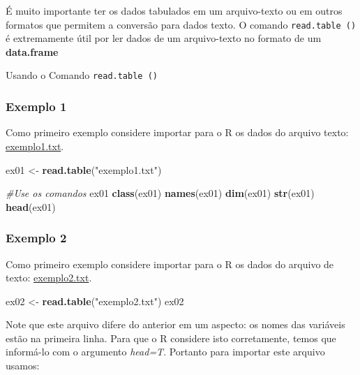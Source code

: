 \documentclass[
]{book}
\newenvironment{Shaded}{\begin{snugshade}}{\end{snugshade}}
\newcommand{\CommentTok}[1]{\textcolor[rgb]{0.56,0.35,0.01}{\textit{#1}}}
\newcommand{\KeywordTok}[1]{\textcolor[rgb]{0.13,0.29,0.53}{\textbf{#1}}}
\newcommand{\NormalTok}[1]{#1}
\newcommand{\StringTok}[1]{\textcolor[rgb]{0.31,0.60,0.02}{#1}}
\begin{document}
É muito importante ter os dados tabulados em um arquivo-texto ou em outros formatos que permitem a conversão para dados texto. O comando \texttt{read.table\ ()} é extremamente útil por ler dados de um arquivo-texto no formato de um \textbf{data.frame}

Usando o Comando \texttt{read.table\ ()}

\hypertarget{exemplo-1-1}{%
\subsubsection{Exemplo 1}\label{exemplo-1-1}}

Como primeiro exemplo considere importar para o R os dados do arquivo texto: \href{https://www.dropbox.com/s/m7jivbbggei5y0x/exemplo1.txt?dl=1}{exemplo1.txt}.

\begin{Shaded}
\begin{Highlighting}[]
\NormalTok{ex01 <-}\StringTok{ }\KeywordTok{read.table}\NormalTok{(}\StringTok{"exemplo1.txt"}\NormalTok{) }

\CommentTok{#Use os comandos}
\NormalTok{  ex01}
  \KeywordTok{class}\NormalTok{(ex01)}
  \KeywordTok{names}\NormalTok{(ex01)}
  \KeywordTok{dim}\NormalTok{(ex01)}
  \KeywordTok{str}\NormalTok{(ex01)}
  \KeywordTok{head}\NormalTok{(ex01)}
\end{Highlighting}
\end{Shaded}

\hypertarget{exemplo-2-1}{%
\subsubsection{Exemplo 2}\label{exemplo-2-1}}

Como primeiro exemplo considere importar para o R os dados do arquivo de texto: \href{https://www.dropbox.com/s/bi4b0j2nnnetc1r/exemplo2.txt?dl=1}{exemplo2.txt}.

\begin{Shaded}
\begin{Highlighting}[]
\NormalTok{ex02 <-}\StringTok{ }\KeywordTok{read.table}\NormalTok{(}\StringTok{"exemplo2.txt"}\NormalTok{) }
\NormalTok{ex02}
\end{Highlighting}
\end{Shaded}

Note que este arquivo difere do anterior em um aspecto: os nomes das variáveis estão na primeira linha. Para que o R considere isto corretamente, temos que informá-lo com o argumento \emph{head=T}. Portanto para importar este arquivo usamos:
\end{document}
